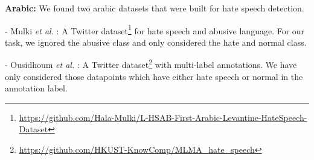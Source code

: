 \documentclass[runningheads]{llncs}
\begin{document}
\noindent\textbf{Arabic:} We found two arabic datasets that were built for hate speech detection.
\begin{compactenum}
    \item [-] Mulki \textit{et al.} \cite{mulki2019hsab} : A Twitter dataset\footnote{\url{https://github.com/Hala-Mulki/L-HSAB-First-Arabic-Levantine-HateSpeech-Dataset}} for hate speech and abusive language. For our task, we ignored the abusive class and only considered the hate and normal class.
    \item [-] Ousidhoum \textit{et al.} \cite{ousidhoum2019multilingual}: A Twitter dataset\footnote{\url{https://github.com/HKUST-KnowComp/MLMA_hate_speech}\label{link:ousidhoum}} with multi-label annotations. We have only considered those datapoints which have either hate speech or normal in the annotation label.
\end{compactenum}
\end{document}
